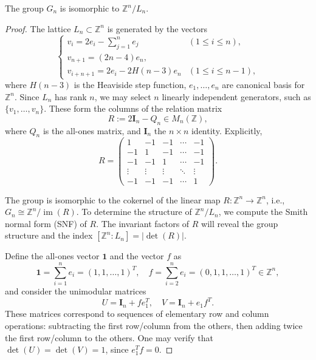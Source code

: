 \documentclass[10pt,a4paper]{amsart}
\newcommand{\Z}{\mathbb{Z}}
\begin{document}
\begin{prop}
	\label{prop:isomorphism-btw-Gn-quotient-Ln}
	The group \( G_n \) is isomorphic to \( \mathbb{Z}^n / L_n \).
\end{prop}

\begin{proof}
	The lattice \( L_n \subset \mathbb{Z}^n \) is generated by the vectors
	\begin{equation}
	    \begin{cases}
	v_i = 2e_i - \sum_{j=1}^n e_j & (1 \leq i \leq n), \\
	v_{n+1} = (2n - 4)e_n, \\
	v_{i+n+1} = 2e_i - 2H(n-3)e_n & (1 \leq i \leq n-1),
	\end{cases} 
    \label{eqn:s5n1}
	\end{equation}
	where \( H(n-3) \) is the Heaviside step function, \( e_1, \dots, e_n\) are canonical basis for \( \Z^n \). Since \( L_n \) has rank \( n \), we may select \( n \) linearly independent generators, such as \( \{v_1, \dots, v_n\} \). These form the columns of the relation matrix
	\[
	R := 2\boldsymbol{I}_n - Q_n \in M_n(\Z),
	\]
	where \( Q_n \) is the all-ones matrix, and \( \boldsymbol{I}_n\) the \( n \times n \) identity. Explicitly,
	\[
	R = 
	\begin{pmatrix}
	1 & -1 & -1 & \cdots & -1 \\
	-1 & 1 & -1 & \cdots & -1 \\
	-1 & -1 & 1 & \cdots & -1 \\
	\vdots & \vdots & \vdots & \ddots & \vdots \\
	-1 & -1 & -1 & \cdots & 1
	\end{pmatrix}.
	\]
	
	The group is isomorphic to the cokernel of the linear map \( R: \mathbb{Z}^n \to \mathbb{Z}^n \), i.e., \( G_n \cong \mathbb{Z}^n / \operatorname{im}(R) \). To determine the structure of \( \mathbb{Z}^n / L_n \), we compute the Smith normal form (SNF) of \( R \). The invariant factors of \( R \) will reveal the group structure and the index \( [\mathbb{Z}^n : L_n] = |\det(R)| \).
	
	Define the all-ones vector \( \mathbf{1} \) and the vector \( f \) as
	\[
	\mathbf{1} = \sum_{i=1}^n e_i = (1,1,\dots,1)^T, \quad f = \sum_{i=2}^n e_i = (0,1,1,\dots,1)^T \in \mathbb{Z}^n,
	\]
	and consider the unimodular matrices
	\[
	U = \boldsymbol{I}_n + f e_1^T, \quad V = \boldsymbol{I}_n + e_1 f^T.
	\]
	These matrices correspond to sequences of elementary row and column operations: subtracting the first row/column from the others, then adding twice the first row/column to the others. One may verify that \( \det(U) = \det(V) = 1 \), since \( e_1^T f = 0 \).
	

\end{proof}
\end{document}
